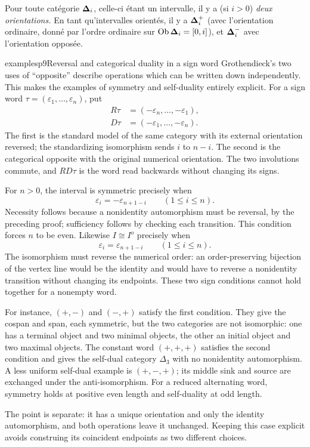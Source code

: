 Pour toute catégorie $\boldsymbol{\Delta}_i$, celle-ci étant un intervalle, il y a (si $i > 0$) \textit{deux orientations.} En tant qu'intervalles orientés, il y a $\boldsymbol{\Delta}_i^+$ (avec l'orientation ordinaire, donné par l'ordre ordinaire sur $\operatorname{Ob} \boldsymbol{\Delta}_i = [0,i]$), et $\boldsymbol{\Delta}_i^-$ avec l'orientation opposée.



\begin{dcomment}{examples}{p9}{Reversal and categorical duality in a sign word}
Grothendieck's two uses of ``opposite'' describe operations which can be written down independently. This makes the examples of symmetry and self-duality entirely explicit. For a sign word $\tau=(\varepsilon_1,\ldots,\varepsilon_n)$, put
\[
\begin{aligned}
 R\tau&=(-\varepsilon_n,\ldots,-\varepsilon_1),\\
 D\tau&=(-\varepsilon_1,\ldots,-\varepsilon_n).
\end{aligned}
\]
The first is the standard model of the same category with its external orientation reversed; the standardizing isomorphism sends $i$ to $n-i$. The second is the categorical opposite with the original numerical orientation. The two involutions commute, and $RD\tau$ is the word read backwards without changing its signs.

For $n>0$, the interval is symmetric precisely when
\[
 \varepsilon_i=-\varepsilon_{n+1-i}\qquad(1\leq i\leq n).
\]
Necessity follows because a nonidentity automorphism must be reversal, by the preceding proof; sufficiency follows by checking each transition. This condition forces $n$ to be even. Likewise $I\cong I^o$ precisely when
\[
 \varepsilon_i=\varepsilon_{n+1-i}\qquad(1\leq i\leq n).
\]
The isomorphism must reverse the numerical order: an order-preserving bijection of the vertex line would be the identity and would have to reverse a nonidentity transition without changing its endpoints. These two sign conditions cannot hold together for a nonempty word.

For instance, $(+,-)$ and $(-,+)$ satisfy the first condition. They give the cospan and span, each symmetric, but the two categories are not isomorphic: one has a terminal object and two minimal objects, the other an initial object and two maximal objects. The constant word $(+,+,+)$ satisfies the second condition and gives the self-dual category $\Delta_3$ with no nonidentity automorphism. A less uniform self-dual example is $(+,-,+)$; its middle sink and source are exchanged under the anti-isomorphism. For a reduced alternating word, symmetry holds at positive even length and self-duality at odd length.

The point is separate: it has a unique orientation and only the identity automorphism, and both operations leave it unchanged. Keeping this case explicit avoids construing its coincident endpoints as two different choices.
\end{dcomment}


